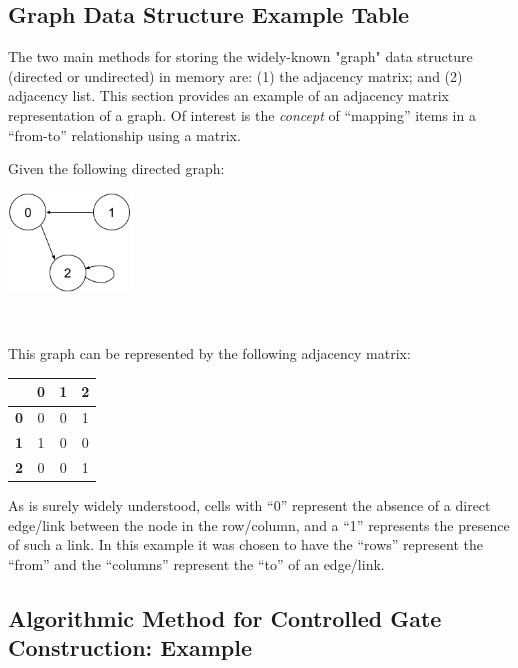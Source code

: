 \documentclass[conference]{IEEEtran}
\begin{document}
\begin{appendices}
\subsection{Graph Data Structure Example Table}
\label{appendix:GraphDataStructureExampleTable}

The two main methods for storing the widely-known "graph" data structure (directed or undirected) in memory are:
(1) the adjacency matrix; and (2) adjacency list. This section provides an example of an adjacency matrix representation of a graph.
Of interest is the \textit{concept} of ``mapping'' items in a ``from-to'' relationship using a matrix.

Given the following directed graph:\\

\centerline{
    \includegraphics[width=0.25\textwidth]{img/basic_graph.png}
}
\label{fig:basicGraphExample}
 \

This graph can be represented by the following adjacency matrix:

\begin{center}
\begin{tabular}{|c|c|c|c|}
    \hline
    \ & \textbf{0} & \textbf{1} & \textbf{2} \\
    \hline
    \textbf{0} & 0 & 0 & 1 \\
    \textbf{1} & 1 & 0 & 0 \\
    \textbf{2} & 0 & 0 & 1 \\
    \hline
\end{tabular}
\end{center}

As is surely widely understood, cells with ``0'' represent the absence of a direct edge/link between the node in the row/column, and a ``1''
represents the presence of such a link. In this example it was chosen to have the ``rows'' represent the ``from''
and the ``columns'' represent the ``to'' of an edge/link.

\subsection{Algorithmic Method for Controlled Gate Construction: Example}
\label{appendix:AlgoMethodControlledGateExample}


\end{appendices}
\end{document}
